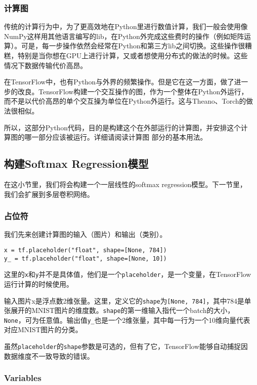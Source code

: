 \subsubsection {计算图}

传统的计算行为中，为了更高效地在Python里进行数值计算，我们一般会使用像NumPy这样用其他语言编写的lib，在Python外完成这些费时的操作（例如矩阵运算）。可是，每一步操作依然会经常在Python和第三方lib之间切换。这些操作很糟糕，特别是当你想在GPU上进行计算，又或者想使用分布式的做法的时候。这些情况下数据传输代价高昂。

在TensorFlow中，也有Python与外界的频繁操作。但是它在这一方面，做了进一步的改良。TensorFlow构建一个交互操作的图，作为一个整体在Python外运行，而不是以代价高昂的单个交互操为单位在Python外运行。这与Theano、Torch的做法很相似。

所以，这部分Python代码，目的是构建这个在外部运行的计算图，并安排这个计算图的哪一部分应该被运行。详细请阅读计算图 部分的基本用法。 %

\subsection{构建Softmax Regression模型}

在这小节里，我们将会构建一个一层线性的softmax regression模型。下一节里，我们会扩展到多层卷积网络。

\subsubsection{占位符}
我们先来创建计算图的输入（图片）和输出（类别）。

\begin{lstlisting}
x = tf.placeholder("float", shape=[None, 784])
y_ = tf.placeholder("float", shape=[None, 10])
\end{lstlisting}

这里的\lstinline{x}和\lstinline{y}并不是具体值，他们是一个\lstinline{placeholder}，是一个变量，在TensorFlow运行计算的时候使用。

输入图片x是浮点数2维张量。这里，定义它的\lstinline{shape}为\lstinline{[None, 784]}，其中784是单张展开的MNIST图片的维度数。\lstinline{shape}的第一维输入指代一个batch的大小，\lstinline{None}，可为任意值。输出值\lstinline{y_}也是一个2维张量，其中每一行为一个10维向量代表对应MNIST图片的分类。

虽然\lstinline{placeholder}的\lstinline{shape}参数是可选的，但有了它，TensorFlow能够自动捕捉因数据维度不一致导致的错误。

\subsubsection{Variables}

